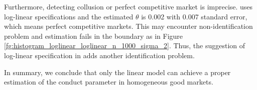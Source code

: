 \documentclass[11pt, a4paper]{article}
\begin{document}
Furthermore, detecting collusion or perfect competitive market is imprecise. 
\cite{merel2009measuring} uses log-linear specifications and the estimated $\theta$ is 0.002 with 0.007 standard error, which means perfect competitive markets. 
This may encounter non-identification problem and estimation fails in the boundary as in Figure \ref{fg:histogram_loglinear_loglinear_n_1000_sigma_2}. 
Thus, the suggestion of log-linear specification in \cite{perloff2012collinearity} adds another identification problem. 






In summary, we conclude that only the linear model can achieve a proper estimation of the conduct parameter in homogeneous good markets. 









\end{document}
